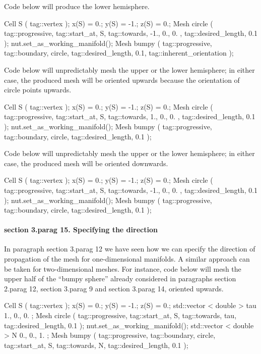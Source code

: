 Code below will produce the lower hemisphere.

\verbatim
   Cell S ( tag::vertex );    x(S) =  0.;  y(S) = -1.;  z(S) =  0.;
   Mesh circle ( tag::progressive, tag::start_at, S, tag::towards, { -1., 0., 0. },
                 tag::desired_length, 0.1                                           );
   nut.set_as_working_manifold();
   Mesh bumpy ( tag::progressive, tag::boundary, circle,
                tag::desired_length, 0.1, tag::inherent_orientation );
\endverbatim

Code below will unpredictably mesh the upper or the lower hemisphere;
in either case, the produced mesh will be oriented upwards because the orientation
of {\codett circle} points upwards.

\verbatim
   Cell S ( tag::vertex );    x(S) =  0.;  y(S) = -1.;  z(S) =  0.;
   Mesh circle ( tag::progressive, tag::start_at, S, tag::towards, { 1., 0., 0. },
                 tag::desired_length, 0.1                                          );
   nut.set_as_working_manifold();
   Mesh bumpy ( tag::progressive, tag::boundary, circle, tag::desired_length, 0.1 );
\endverbatim

Code below will unpredictably mesh the upper or the lower hemisphere;
in either case, the produced mesh will be oriented downwards.

\verbatim
   Cell S ( tag::vertex );    x(S) =  0.;  y(S) = -1.;  z(S) =  0.;
   Mesh circle ( tag::progressive, tag::start_at, S, tag::towards, { -1., 0., 0. },
                 tag::desired_length, 0.1                                           );
   nut.set_as_working_manifold();
   Mesh bumpy ( tag::progressive, tag::boundary, circle, tag::desired_length, 0.1 );
\endverbatim


\paragraph{\numb section 3.\numb parag 15. Specifying the direction}

In paragraph \numb section 3.\numb parag 12 we have seen how we can specify the direction
of propagation of the mesh for one-dimensional manifolds.
A similar approach can be taken for two-dimensional meshes.
For instance, code below will mesh the upper half of the ``bumpy sphere'' already considered
in paragraphs \numb section 2.\numb parag 12, \numb section 3.\numb parag 9 and
\numb section 3.\numb parag 14, oriented upwards.

\verbatim
   Cell S ( tag::vertex );    x(S) =  0.;  y(S) = -1.;  z(S) =  0.;
   std::vector < double > tau { 1., 0., 0. };
   Mesh circle ( tag::progressive, tag::start_at, S, tag::towards, tau,
                 tag::desired_length, 0.1                               );
   nut.set_as_working_manifold();
   std::vector < double > N { 0., 0., 1. };
   Mesh bumpy ( tag::progressive, tag::boundary, circle,
                tag::start_at, S, tag::towards, N,
                tag::desired_length, 0.1                 );
\endverbatim

